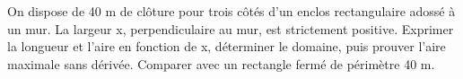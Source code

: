 \documentclass[11pt]{article}
\begin{document}
On dispose de 40 m de clôture pour trois côtés d’un enclos rectangulaire adossé à un mur. La largeur x, perpendiculaire au mur, est strictement positive. Exprimer la longueur et l’aire en fonction de x, déterminer le domaine, puis prouver l’aire maximale sans dérivée. Comparer avec un rectangle fermé de périmètre 40 m.\par
\vspace{5pt}
\end{document}
